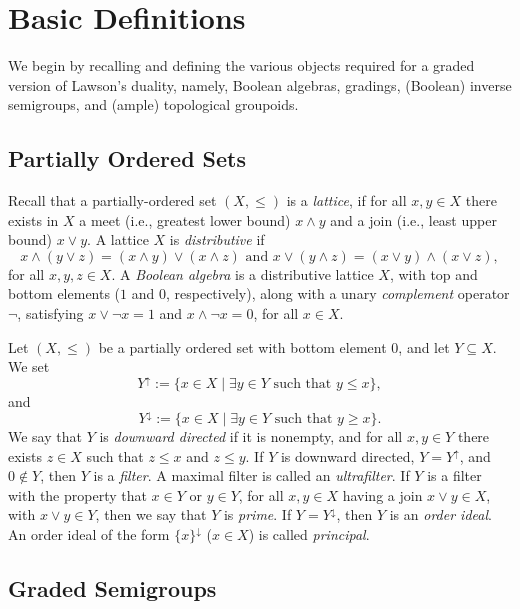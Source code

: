 \documentclass[a4paper,reqno,12pt]{amsart}
\numberwithin{equation}{section}
\theoremstyle{plain}
\theoremstyle{definition}
\begin{document}
\section{Basic Definitions} \label{def-sect}

We begin by recalling and defining the various objects required for a graded version of Lawson's duality, namely, Boolean algebras, gradings, (Boolean) inverse semigroups, and (ample) topological groupoids.

\subsection{Partially Ordered Sets}

Recall that a partially-ordered set $(X, \leq)$ is a \textit{lattice}, if for all $x, y\in X$ there exists in $X$ a meet (i.e., greatest lower bound) $x \wedge y$ and a join (i.e., least upper bound) $x\vee y$. A lattice $X$ is \textit{distributive} if 
\[x\wedge(y\vee z) = (x\wedge y)\vee (x\wedge z) \text{ and } x\vee(y\wedge z) = (x\vee y) \wedge (x\vee z),\] 
for all $x, y, z\in X$. A \emph{Boolean algebra} is a distributive lattice $X$, with top and bottom elements ($1$ and $0$, respectively), along with a unary \emph{complement} operator $\lnot$, satisfying $x \lor \lnot x = 1$ and $x \land \lnot x = 0$, for all $x \in X$.

Let $(X, \leq)$ be a partially ordered set with bottom element $0$, and let $Y \subseteq X$. We set 
\[Y^{\uparrow} := \{x \in X \mid \exists y \in Y \text{ such that } y \leq x\},\]
and
\[Y^{\downarrow} := \{x \in X \mid \exists y \in Y \text{ such that } y \geq x\}.\]
We say that $Y$ is \emph{downward directed} if it is nonempty, and for all $x,y \in Y$ there exists $z\in X$ such that $z \leq x$ and $z \leq y$. If $Y$ is downward directed, $Y = Y^{\uparrow}$, and $0 \notin Y$, then $Y$ is a \emph{filter}. A maximal filter is called an \emph{ultrafilter}. If $Y$ is a filter with the property that $x \in Y$ or $y \in Y$, for all $x,y \in X$ having a join $x \lor y \in X$, with $x \lor y \in Y$, then we say that $Y$ is \emph{prime}. If $Y = Y^{\downarrow}$, then $Y$ is an \emph{order ideal}. An order ideal of the form $\{x\}^{\downarrow}$ ($x \in X$) is called \emph{principal}.

\subsection{Graded Semigroups} \label{gradedsemisubsection}
\end{document}
